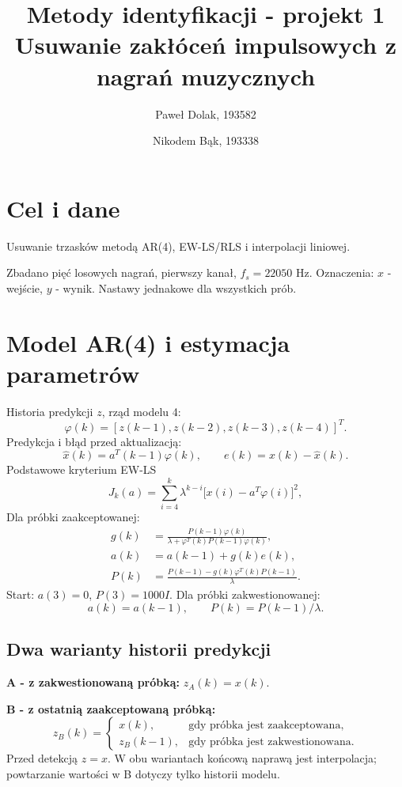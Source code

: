 \documentclass[11pt,a4paper]{article}
\title{Metody identyfikacji - projekt 1\\[4pt]\large Usuwanie zakłóceń impulsowych z nagrań muzycznych}
\author{Paweł Dolak, 193582 \and Nikodem Bąk, 193338}
\date{}
\begin{document}
\maketitle

\section{Cel i dane}
Usuwanie trzasków metodą AR(4), EW-LS/RLS i interpolacji liniowej.

Zbadano pięć losowych nagrań, pierwszy kanał, $f_s=22050$ Hz. Oznaczenia: $x$ - wejście, $y$ - wynik. Nastawy jednakowe dla wszystkich prób.

\section{Model AR(4) i estymacja parametrów}
Historia predykcji $z$, rząd modelu 4:
\begin{equation}
\varphi(k)=[z(k-1),z(k-2),z(k-3),z(k-4)]^T.
\end{equation}
Predykcja i błąd przed aktualizacją:
\begin{equation}
\hat{x}(k)=a^T(k-1)\varphi(k),\qquad e(k)=x(k)-\hat{x}(k).
\end{equation}
Podstawowe kryterium EW-LS
\begin{equation}
J_k(a)=\sum_{i=4}^{k}\lambda^{k-i}\bigl[x(i)-a^T\varphi(i)\bigr]^2,
\end{equation}
Dla próbki zaakceptowanej:
\begin{align}
g(k)&=\frac{P(k-1)\varphi(k)}{\lambda+\varphi^T(k)P(k-1)\varphi(k)},\\
a(k)&=a(k-1)+g(k)e(k),\\
P(k)&=\frac{P(k-1)-g(k)\varphi^T(k)P(k-1)}{\lambda}.
\end{align}
Start: $a(3)=0$, $P(3)=1000I$. Dla próbki zakwestionowanej:
\begin{equation}
a(k)=a(k-1),\qquad P(k)=P(k-1)/\lambda.
\end{equation}


\subsection{Dwa warianty historii predykcji}
\textbf{A - z zakwestionowaną próbką:} $z_A(k)=x(k)$.

\textbf{B - z ostatnią zaakceptowaną próbką:}
\begin{equation}
z_B(k)=\begin{cases}
x(k), & \text{gdy próbka jest zaakceptowana},\\
z_B(k-1), & \text{gdy próbka jest zakwestionowana}.
\end{cases}
\end{equation}
Przed detekcją $z=x$. W obu wariantach końcową naprawą jest interpolacja; powtarzanie wartości w B dotyczy tylko historii modelu.
\end{document}

